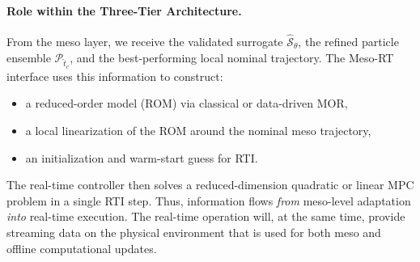 \documentclass{article}
\newcommand{\1}{\mathds{1}}          %
\theoremstyle{definition}
\begin{document}
\begin{sloppypar}
\paragraph{Role within the Three-Tier Architecture.}
From the meso layer, we receive the validated surrogate $\hat{\mathcal{S}}_{\theta}$, the refined particle ensemble $\mathcal{P}_{\hat{t}_c}$, and the best-performing local nominal trajectory. The Meso-RT interface uses this information to construct:
\begin{itemize}
    \item a reduced-order model (ROM) via classical or data-driven MOR,
    \item a local linearization of the ROM around the nominal meso trajectory,
    \item an initialization and warm-start guess for RTI.
\end{itemize}
The real-time controller then solves a reduced-dimension quadratic or linear MPC problem 
in a single RTI step. Thus, information flows \emph{from} meso-level adaptation 
\emph{into} real-time execution. The real-time operation will, at the same time, provide streaming data on the physical environment that is used for both meso and offline computational updates. 



\end{sloppypar}
\end{document}
